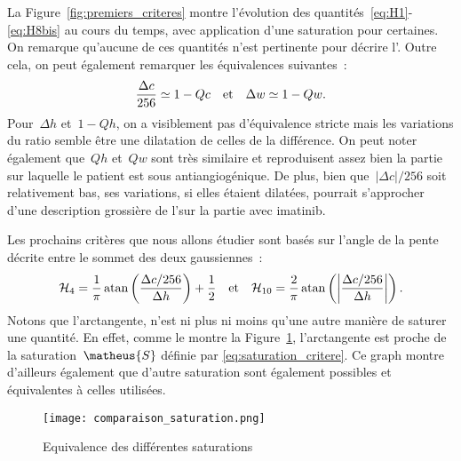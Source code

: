 \documentclass[main.tex]{subfiles}
\begin{document}
La Figure~\ref{fig:premiers_criteres} montre l'évolution des quantités~\eqref{eq:H1}-\eqref{eq:H8bis} au cours du temps, avec application d'une saturation pour certaines. 
On remarque qu'aucune de ces quantités n'est pertinente pour décrire l'\hetero. Outre cela, on peut également remarquer les équivalences suivantes~:
\begin{equation}
\label{eq:equiv_diff_rapport}
\dfrac{\Delta c}{256} \simeq 1 - Qc \quad {\rm et } \quad \Delta w \simeq 1 - Qw.
\end{equation}
Pour~$\Delta h$ et~$1-Qh$, on a visiblement pas d'équivalence stricte mais les variations du ratio semble être une dilatation de celles de la différence.
On peut noter également que~$Qh$ et~$Qw$ sont très similaire et reproduisent assez bien la partie sur laquelle le patient est sous antiangiogénique. De plus, bien que~$| \Delta c | / 256$ soit relativement bas, ses variations, si elles étaient dilatées,  pourrait s'approcher d'une description grossière de l'\hetero sur la partie avec imatinib.

Les prochains critères que nous allons étudier sont basés sur l'angle de la pente 
décrite entre le sommet des deux gaussiennes~:
\begin{equation}
\label{eq:critere_pente}
\mathcal{H}_4 = \dfrac{1}{\pi} \operatorname{atan} \left( \dfrac{ \Delta c / 256 }{ \Delta h }  \right) + \dfrac{1}{2}
\quad {\rm et } \quad
\mathcal{H}_{10} = \dfrac{2}{\pi} \operatorname{atan} \left( \left| \dfrac{ \Delta c / 256 }{ \Delta h } \right| \right).
\end{equation}
Notons que l'arctangente, n'est ni plus ni moins qu'une autre manière de saturer une quantité. En effet, comme le montre la Figure~\ref{fig:comp_saturation}, l'arctangente est proche de la saturation~$\matheus{S}$ définie par \eqref{eq:saturation_critere}. Ce graph montre d'ailleurs également que d'autre saturation sont également possibles et équivalentes à celles utilisées.

\begin{figure}
\centering
\texttt{[image: comparaison\_saturation.png]}
\vspace{-3mm}
\caption{\label{fig:comp_saturation}Equivalence des différentes saturations}
\end{figure}
\end{document}
